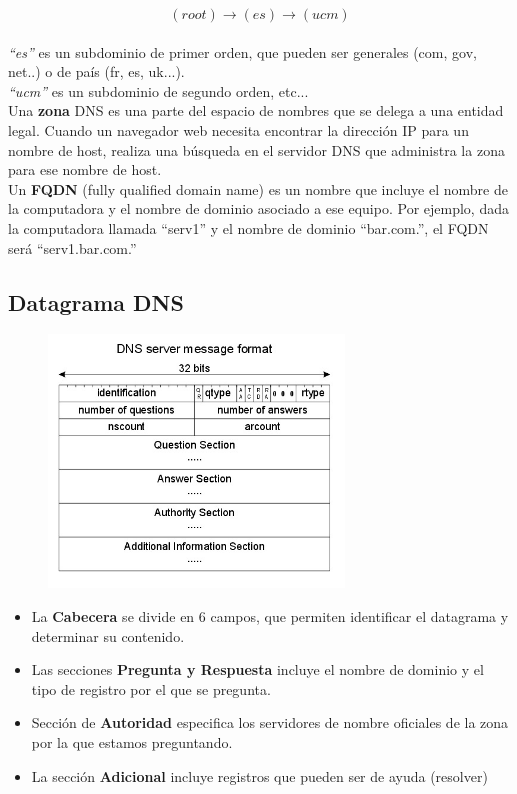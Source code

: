 \[(root) \rightarrow (es) \rightarrow (ucm)\]\\
\textit{\enquote{es}} es un subdominio de primer orden, que pueden ser generales (com, gov, net..) o de país (fr, es, uk...).\\

\textit{\enquote{ucm}} es un subdominio de segundo orden, etc...\\

Una \textbf{zona} DNS es una parte del espacio de nombres que se delega a una entidad legal. Cuando un navegador web necesita encontrar la dirección IP para un nombre de host, realiza una búsqueda en el servidor DNS que administra la zona para ese nombre de host.\\

Un \textbf{FQDN} (fully qualified domain name) es un nombre que incluye el nombre de la computadora y el nombre de dominio asociado a ese equipo. Por ejemplo, dada la computadora llamada \enquote{serv1} y el nombre de dominio \enquote{bar.com.}, el FQDN será \enquote{serv1.bar.com.}
\newpage
\subsection{Datagrama DNS}
\begin{figure}[H]\centering\includegraphics[width=0.7\textwidth]{img/DNS_Datagram.jpg}
\end{figure}
\begin{itemize}
    \item La \textbf{Cabecera} se divide en 6 campos, que permiten identificar el datagrama y determinar su contenido.
    \item Las secciones \textbf{Pregunta y Respuesta} incluye el nombre de dominio y el tipo de registro por el que se pregunta.
    \item Sección de \textbf{Autoridad} especifica los servidores de nombre oficiales de la zona por la que estamos preguntando.
    \item La sección \textbf{Adicional} incluye registros que pueden ser de ayuda (resolver)
\end{itemize}
